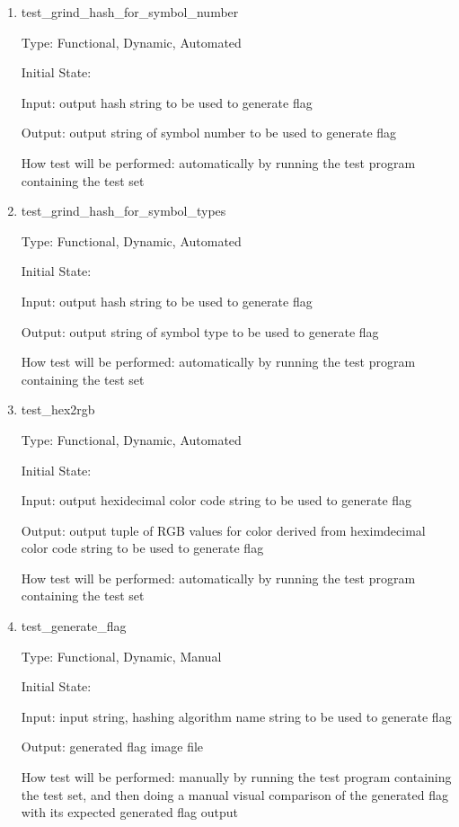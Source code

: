 \documentclass[12pt, titlepage]{article}
\begin{document}
\begin{enumerate}
\item{test\_grind\_hash\_for\_symbol\_number\\}

Type: Functional, Dynamic, Automated

Initial State:

Input: output hash string to be used to generate flag

Output: output string of symbol number to be used to generate flag

How test will be performed: automatically by running the test program
containing the test set

\item{test\_grind\_hash\_for\_symbol\_types\\}

Type: Functional, Dynamic, Automated

Initial State:

Input: output hash string to be used to generate flag

Output: output string of symbol type to be used to generate flag

How test will be performed: automatically by running the test program
containing the test set

\item{test\_hex2rgb\\}

Type: Functional, Dynamic, Automated

Initial State:

Input: output hexidecimal color code string to be used to generate flag

Output: output tuple of RGB values for color derived from heximdecimal color
code string to be used to generate flag

How test will be performed: automatically by running the test program
containing the test set

\item{test\_generate\_flag\\}

Type: Functional, Dynamic, Manual

Initial State:

Input: input string, hashing algorithm name string to be used to generate flag

Output: generated flag image file

How test will be performed: manually by running the test program containing
the test set, and then doing a manual visual comparison of the generated flag
with its expected generated flag output


\end{enumerate}
\end{document}
